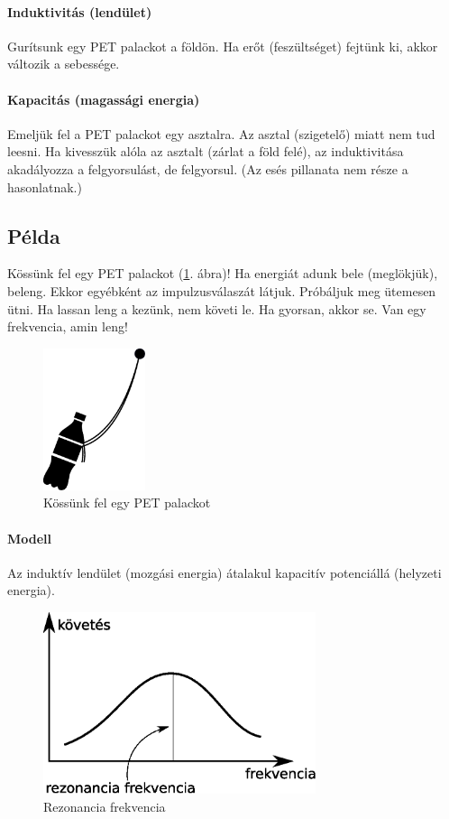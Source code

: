\documentclass[12pt,a4paper]{article}
\begin{document}
\paragraph{Induktivitás (lendület)} Gurítsunk egy PET palackot a földön. Ha erőt (feszültséget) fejtünk ki, akkor változik a sebessége.

\paragraph{Kapacitás (magassági energia)} Emeljük fel a PET palackot egy asztalra. Az asztal (szigetelő) miatt nem tud leesni. Ha kivesszük alóla az asztalt (zárlat a föld felé), az induktivitása akadályozza a felgyorsulást, de felgyorsul. (Az esés pillanata nem része a hasonlatnak.)

\subsection{Példa}


Kössünk fel egy PET palackot (\ref{fig:palack}. ábra)! Ha energiát adunk bele (meglökjük), beleng. Ekkor egyébként az impulzusválaszát látjuk. Próbáljuk meg ütemesen ütni. Ha lassan leng a kezünk, nem követi le. Ha gyorsan, akkor se. Van egy frekvencia, amin leng!


\begin{figure}[H]
\begin{center}
\includegraphics[width=3cm]{figures/szurok_palack.eps}
\caption{Kössünk fel egy PET palackot}
\label{fig:palack}
\end{center}
\end{figure}

\paragraph{Modell} Az induktív lendület (mozgási energia) átalakul kapacitív potenciállá (helyzeti energia).


\begin{figure}[H]
\begin{center}
\includegraphics[width=8cm]{figures/szurok_rezonancia.eps}
\caption{Rezonancia frekvencia}
\label{fig:rezonancia}
\end{center}
\end{figure}
\end{document}
